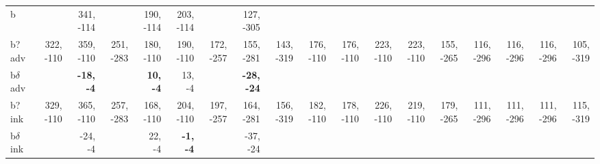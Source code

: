 \begin{table}[p]
{\begin{tabular}{lrrrrrrrrrrrrrrrrr}
b &  & 341, -114 &  & 190, -114 & 203, -114 &  & 127, -305 &  &  &  &  &  &  &  &  &  &  \\
b? adv & 322, -110 & 359, -110 & 251, -283 & 180, -110 & 190, -110 & 172, -257 & 155, -281 & 143, -319 & 176, -110 & 176, -110 & 223, -110 & 223, -110 & 155, -265 & 116, -296 & 116, -296 & 116, -296 & 105, -319 \\
b$\delta$ adv &  & \textbf{-18, -4} &  & \textbf{10, -4} & 13, -4 &  & \textbf{-28, -24} &  &  &  &  &  &  &  &  &  &  \\
b? ink & 329, -110 & 365, -110 & 257, -283 & 168, -110 & 204, -110 & 197, -257 & 164, -281 & 156, -319 & 182, -110 & 178, -110 & 226, -110 & 219, -110 & 179, -265 & 111, -296 & 111, -296 & 111, -296 & 115, -319 \\
b$\delta$ ink &  & -24, -4 &  & 22, -4 & \textbf{-1, -4} &  & -37, -24 &  &  &  &  &  &  &  &  &  &  \\

\end{tabular}
}
\end{table}
\clearpage


